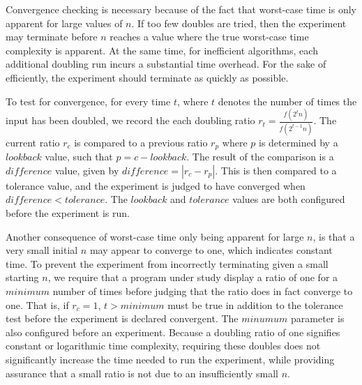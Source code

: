   Convergence checking is necessary because of the fact that worst-case time is only apparent for large values of $n$.
  If too few doubles are tried, then the experiment may terminate before $n$ reaches a value where the true worst-case
  time complexity is apparent. At the same time, for inefficient  algorithms, each additional doubling run incurs a
  substantial time overhead. For the sake of efficiently, the experiment should terminate as quickly as possible.

  To test for convergence, for every time $t$, where $t$ denotes the number of times the input has been doubled, we
  record the each doubling ratio $r_t = \frac{f(2^t n)}{f(2^{t-1}n)}$. The current ratio $r_c$ is compared to a previous
  ratio $r_p$ where $p$ is determined by a $\mathit{lookback}$ value, such that $p=c-\mathit{lookback}$.  The result of
  the comparison is a $\mathit{difference}$ value, given by $\mathit{difference} = |r_c - r_p|$.  This is then compared
  to a tolerance value, and the experiment is judged to have converged when $\mathit{difference}<\mathit{tolerance}$.
  The $\mathit{lookback}$ and $\mathit{tolerance}$ values are both configured before the experiment is run.

  Another consequence of worst-case time only being apparent for large $n$, is that a very small initial $n$ may appear
  to converge to one, which indicates constant time. To prevent the experiment from incorrectly terminating given a
  small starting $n$, we require that a program under study display a ratio of one for a $\mathit{minimum}$ number of
  times before judging that the ratio does in fact converge to one.  That is, if $r_c = 1$, $t > \mathit{minimum}$ must
  be true in addition to the tolerance test before the experiment is declared convergent.  The $\mathit{minumum}$
  parameter is also configured before an experiment.  Because a doubling ratio of one signifies constant or logarithmic
  time complexity, requiring these doubles does not significantly increase the time needed to run the experiment, while
  providing assurance that a small ratio is not due to an insufficiently small $n$.
